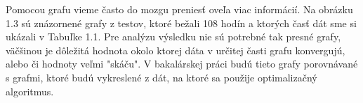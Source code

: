 Pomocou grafu vieme často do mozgu preniesť oveľa viac informácií. 
Na obrázku 1.3 sú znázornené grafy z testov, ktoré bežali 108 hodín a ktorých časť dát sme si ukázali v Tabuľke 1.1. Pre analýzu výsledku nie sú potrebné tak presné grafy, väčšinou je dôležitá hodnota okolo ktorej dáta v určitej časti grafu konvergujú, alebo či hodnoty veľmi "skáču". V bakalárskej práci budú tieto grafy porovnávané s grafmi, ktoré budú vykreslené z dát, na ktoré sa použije optimalizačný algoritmus.



